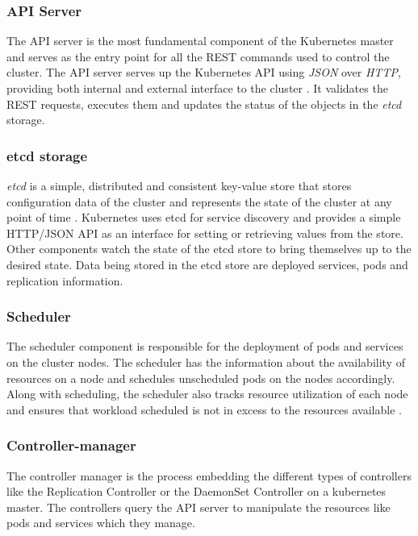 \documentclass[9pt,twocolumn,twoside]{../../styles/osajnl}
\begin{document}
{\subsubsection{API Server}
The API server is the most fundamental component of the Kubernetes
master and serves as the entry point for all the REST commands used to
control the cluster. The API server serves up the Kubernetes API using
\emph{JSON} over \emph{HTTP}, providing both internal and external
interface to the cluster \cite{www-kubernetes-digitalocean}
\cite{www-apiserver-kmblog}. It validates the REST requests, executes
them and updates the status of the objects in the \emph{etcd} storage.

\subsubsection{etcd storage}
\emph{etcd} is a simple, distributed and consistent key-value store
that stores configuration data of the cluster and represents the state
of the cluster at any point of time
\cite{www-wiki-kubernetes}. Kubernetes uses etcd for service discovery
and provides a simple HTTP/JSON API as an interface for setting or
retrieving values from the store. Other components watch the state of
the etcd store to bring themselves up to the desired state. Data being
stored in the etcd store are deployed services, pods and replication
information.

\subsubsection{Scheduler}
The scheduler component is responsible for the deployment of pods and
services on the cluster nodes. The scheduler has the information about
the availability of resources on a node and schedules unscheduled pods
on the nodes accordingly. Along with scheduling, the scheduler also
tracks resource utilization of each node and ensures that workload
scheduled is not in excess to the resources available
\cite{www-wiki-kubernetes}.

\subsubsection{Controller-manager}
The controller manager is the process embedding the different types of
controllers like the Replication Controller or the DaemonSet
Controller on a kubernetes master. The controllers query the API
server to manipulate the resources like pods and services  which they
manage.

}
\end{document}
